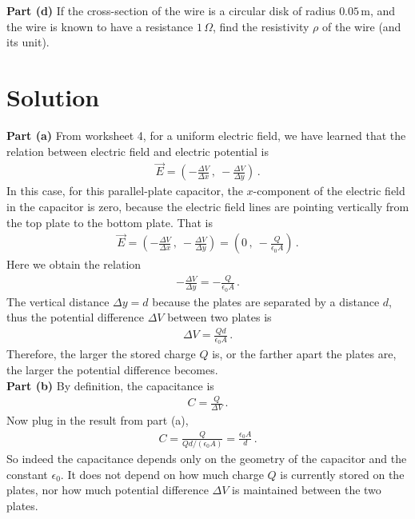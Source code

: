 \documentclass[11pt]{article}
\begin{document}
\noindent\textbf{Part (d)} If the cross-section of the wire is a circular disk of radius $0.05\,$m, and the wire is known to have a resistance $1\,\Omega$, find the resistivity $\rho$ of the wire (and its unit). 


\newpage
\section*{Solution}

\noindent\textbf{Part (a)} From worksheet 4, for a uniform electric field, we have learned that the relation between electric field and electric potential is
\begin{align*}
\vec{E} = \left( -\frac{\Delta V}{\Delta x}\,,\ -\frac{\Delta V}{\Delta y}\right)\,.
\end{align*}
In this case, for this parallel-plate capacitor, the $x$-component of the electric field in the capacitor is zero, because the electric field lines are pointing vertically from the top plate to the bottom plate. That is
\begin{align*}
\vec{E} = \left( -\frac{\Delta V}{\Delta x}\,,\ -\frac{\Delta V}{\Delta y}\right) = \left(0\,,\ -\frac{Q}{\epsilon_0 A}\right)\,.
\end{align*}
Here we obtain the relation
\begin{align*}
-\frac{\Delta V}{\Delta y} = -\frac{Q}{\epsilon_0 A}\,.
\end{align*}
The vertical distance $\Delta y = d$ because the plates are separated by a distance $d$, thus the potential difference $\Delta V$ between two plates is
\begin{align*}
\Delta V  = \frac{Qd}{\epsilon_0 A}\,.
\end{align*}
Therefore, the larger the stored charge $Q$ is, or the farther apart the plates are, the larger the potential difference becomes.\\

\noindent\textbf{Part (b)} By definition, the capacitance is
\begin{align*}
C = \frac{Q}{\Delta V}\,.
\end{align*}
Now plug in the result from part (a),
\begin{align*}
C = \frac{Q}{Qd/(\epsilon_0 A)} = \frac{\epsilon_0 A}{d}\,.
\end{align*}
So indeed the capacitance depends only on the geometry of the capacitor and the constant $\epsilon_0$. It does not depend on how much charge $Q$ is currently stored on the plates, nor how much potential difference $\Delta V$ is maintained between the two plates.\\
\end{document}
